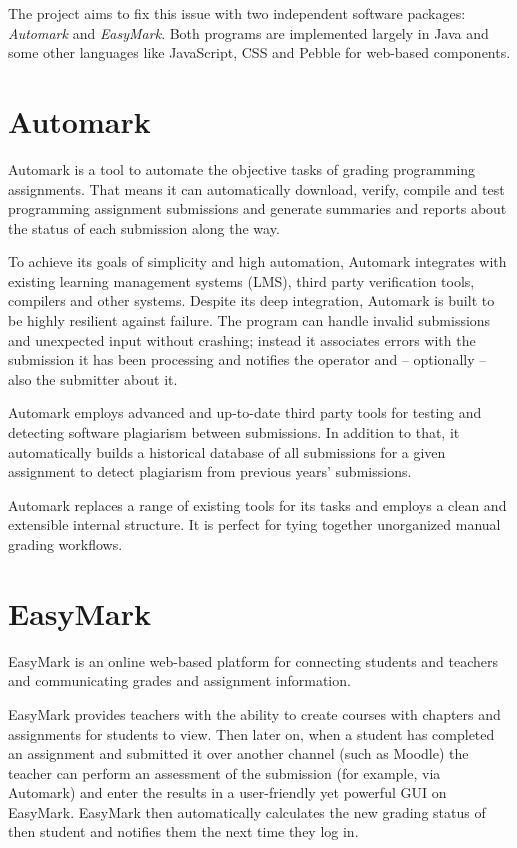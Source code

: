 \documentclass[12pt,a4paper,oneside]{report}
\begin{document}
	The project aims to fix this issue with two independent software packages: \emph{Automark} and \emph{EasyMark}. Both programs are implemented largely in Java and some other languages like JavaScript, CSS and Pebble\parencite{pebblewebsite} for web-based components.

	\section{Automark}
	Automark is a tool to automate the objective tasks of grading programming assignments. That means it can automatically download, verify, compile and test programming assignment submissions and generate summaries and reports about the status of each submission along the way.

	To achieve its goals of simplicity and high automation, Automark integrates with existing learning management systems (LMS), third party verification tools, compilers and other systems. Despite its deep integration, Automark is built to be highly resilient against failure. The program can handle invalid submissions and unexpected input without crashing; instead it associates errors with the submission it has been processing and notifies the operator and -- optionally -- also the submitter about it.

	Automark employs advanced and up-to-date third party tools for testing and detecting software plagiarism between submissions. In addition to that, it automatically builds a historical database of all submissions for a given assignment to detect plagiarism from previous years' submissions.

	Automark replaces a range of existing tools for its tasks and employs a clean and extensible internal structure. It is perfect for tying together unorganized manual grading workflows.

	\section{EasyMark}
	EasyMark is an online web-based platform for connecting students and teachers and communicating grades and assignment information.

	EasyMark provides teachers with the ability to create courses with chapters and assignments for students to view. Then later on, when a student has completed an assignment and submitted it over another channel (such as Moodle) the teacher can perform an assessment of the submission (for example, via Automark) and enter the results in a user-friendly yet powerful GUI on EasyMark. EasyMark then automatically calculates the new grading status of then student and notifies them the next time they log in.
\end{document}
